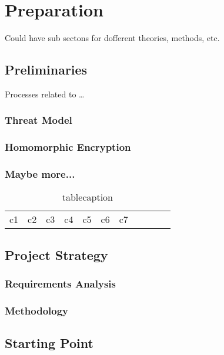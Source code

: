 \chapter{Preparation}
\label{chap:preparation}

Could have sub sectons for dofferent theories, methods, etc. 

\section{Preliminaries}
Processes related to \ldots
\subsection{Threat Model}

\subsection{Homomorphic Encryption}

\subsection{Maybe more...}

\begin{table}[!htbp]\centering
\def\arraystretch{1.3}
\caption{tablecaption}
\vspace{5pt}
    \small
\setlength{\tabcolsep}{4pt}
\begin{tabular}{lcrccccccll}
\hline
 c1 & c2 & c3 & c4 & c5 & c6 & c7 \\
\end{tabular}
\label{Tab:1}
\end{table}
\normalsize


\section{Project Strategy}

\subsection{Requirements Analysis}

\subsection{Methodology}


\section{Starting Point}


